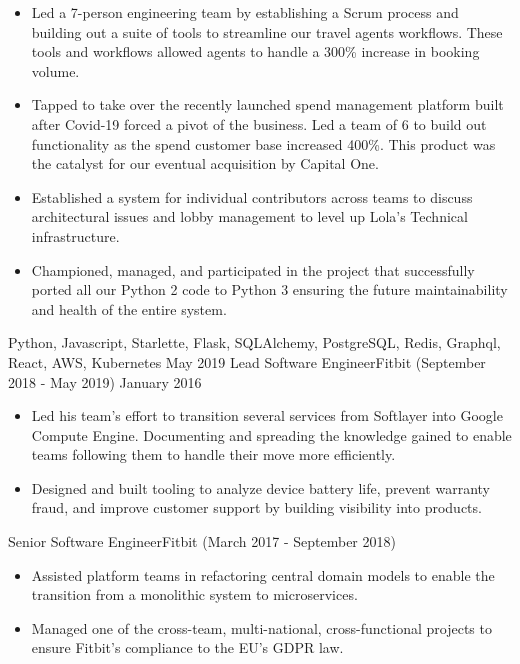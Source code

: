 \begin{experiences}
{\begin{itemize}
                        \item Led a 7-person engineering team by establishing a Scrum process and building out a suite of tools to streamline our travel agents workflows. These tools and workflows allowed agents to handle a 300\% increase in booking volume.
                        \item Tapped to take over the recently launched spend management platform built after Covid-19 forced a pivot of the business. Led a team of 6 to build out functionality as the spend customer base increased 400\%. This product was the catalyst for our eventual acquisition by Capital One.
                        \item Established a system for individual contributors across teams to discuss architectural issues and lobby management to level up Lola's Technical infrastructure. 
                        \item Championed, managed, and participated in the project that successfully ported all our Python 2 code to Python 3 ensuring the future maintainability and health of the entire system.
                      \end{itemize}
                  }
                  {Python, Javascript, Starlette, Flask, SQLAlchemy, PostgreSQL, Redis, Graphql, React, AWS, Kubernetes}
  \emptySeparator
  \experience
  {May 2019}  {Lead Software Engineer}{Fitbit {\footnotesize (September 2018 - May 2019)}}
  {January 2016}   {
                      \begin{itemize}
                        \item Led his team’s effort to transition several services from Softlayer into Google Compute Engine. Documenting and spreading the knowledge gained to enable teams following them to handle their move more efficiently.
                        \item Designed and built tooling to analyze device battery life, prevent warranty fraud, and improve customer support by building visibility into products.
                      \end{itemize}
                  }
                  {}
  \experience
  {}  {Senior Software Engineer}{Fitbit {\footnotesize (March 2017 - September 2018)}}
  {}   {
                      \begin{itemize}
                        \item Assisted platform teams in refactoring central domain models to enable the transition from a monolithic system to microservices.
                        \item Managed one of the cross-team, multi-national, cross-functional projects to ensure Fitbit’s compliance to the EU’s GDPR law.

\end{itemize}}
\end{experiences}
